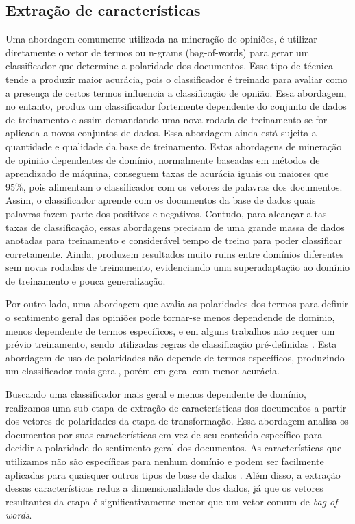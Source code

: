 \documentclass[template.tex]{subfiles}
\begin{document}
\subsection{Extração de características}

Uma abordagem comumente utilizada na mineração de opiniões, é utilizar diretamente o vetor de termos ou n-grams (bag-of-words) para gerar um classificador que determine a polaridade dos documentos. Esse tipo de técnica tende a produzir maior acurácia, pois o classificador é treinado para avaliar como a presença de certos termos influencia a classificação de opnião. Essa abordagem, no entanto, produz um classificador fortemente dependente do conjunto de dados de treinamento e assim demandando uma nova rodada de treinamento se for aplicada a novos conjuntos de dados. Essa abordagem ainda está sujeita a quantidade e qualidade da base de treinamento. Estas abordagens de mineração de opinião dependentes de domínio, normalmente baseadas em métodos de aprendizado de máquina, conseguem taxas de acurácia iguais ou maiores que 95\%, pois alimentam o classificador com os vetores de palavras dos documentos. Assim, o classificador aprende com os documentos da base de dados quais palavras fazem parte dos positivos e negativos. Contudo, para alcançar altas taxas de classificação, essas abordagens precisam de uma grande massa de dados anotadas para treinamento e considerável tempo de treino para poder classificar corretamente. Ainda, produzem resultados muito ruins entre domínios diferentes sem novas rodadas de treinamento, evidenciando uma superadaptação ao domínio de treinamento e pouca generalização.


Por outro lado, uma abordagem que avalia as polaridades dos termos para definir o sentimento geral das opiniões pode tornar-se menos dependende de dominio, menos dependente de termos específicos,  e em alguns trabalhos não requer um prévio treinamento, sendo utilizadas regras de classificação pré-definidas \cite{nadali2010sentiment, pimpalkar2013sentimental}. Esta abordagem de uso de polaridades não depende de termos específicos, produzindo um classificador mais geral, porém em geral com menor acurácia. 


Buscando uma classificador mais geral e menos dependente de domínio, realizamos uma sub-etapa de extração de características dos documentos a partir dos vetores de polaridades da etapa de transformação. Essa abordagem analisa os documentos por suas características em vez de seu conteúdo específico para decidir a polaridade do sentimento geral dos documentos. As características que utilizamos não são específicas para nenhum domínio e podem ser facilmente aplicadas para quaisquer outros tipos de base de dados \cite{pang2002thumbs}. Além disso, a extração dessas características reduz a dimensionalidade dos dados, já que os vetores resultantes da etapa é significativamente menor que um vetor comum de \textit{bag-of-words}.
\end{document}
